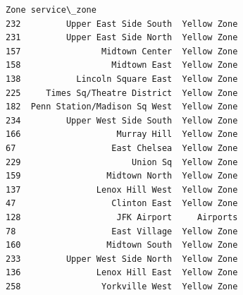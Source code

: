 \documentclass[11pt]{article}
\begin{document}
\begin{Verbatim}[commandchars=\\\{\}]
                             Zone service\_zone
232         Upper East Side South  Yellow Zone
231         Upper East Side North  Yellow Zone
157                Midtown Center  Yellow Zone
158                  Midtown East  Yellow Zone
138           Lincoln Square East  Yellow Zone
225     Times Sq/Theatre District  Yellow Zone
182  Penn Station/Madison Sq West  Yellow Zone
234         Upper West Side South  Yellow Zone
166                   Murray Hill  Yellow Zone
67                   East Chelsea  Yellow Zone
229                      Union Sq  Yellow Zone
159                 Midtown North  Yellow Zone
137               Lenox Hill West  Yellow Zone
47                   Clinton East  Yellow Zone
128                   JFK Airport     Airports
78                   East Village  Yellow Zone
160                 Midtown South  Yellow Zone
233         Upper West Side North  Yellow Zone
136               Lenox Hill East  Yellow Zone
258                Yorkville West  Yellow Zone
    \end{Verbatim}
\end{document}

